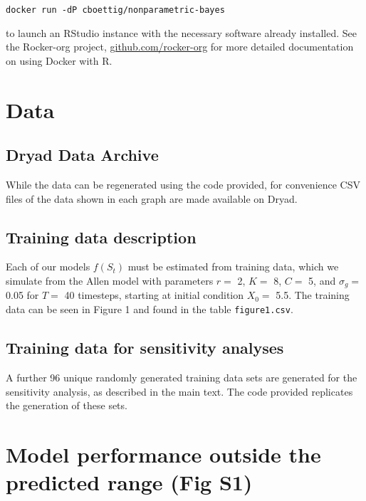 \documentclass[]{components/elsarticle}
\begin{document}
\begin{verbatim}
docker run -dP cboettig/nonparametric-bayes
\end{verbatim}

to launch an RStudio instance with the necessary software already
installed. See the Rocker-org project,
\href{https://github.com/rocker-org}{github.com/rocker-org} for more
detailed documentation on using Docker with R.

\section{Data}\label{data}

\subsection{Dryad Data Archive}\label{dryad-data-archive}

While the data can be regenerated using the code provided, for
convenience CSV files of the data shown in each graph are made available
on Dryad.

\subsection{Training data description}\label{training-data-description}

Each of our models $f(S_t)$ must be estimated from training data, which
we simulate from the Allen model with parameters $r = $ 2, $K =$ 8,
$C =$ 5, and $\sigma_g =$ 0.05 for $T=$ 40 timesteps, starting at
initial condition $X_0 = $ 5.5. The training data can be seen in Figure
1 and found in the table \texttt{figure1.csv}.

\subsection{Training data for sensitivity
analyses}\label{training-data-for-sensitivity-analyses}

A further 96 unique randomly generated training data sets are generated
for the sensitivity analysis, as described in the main text. The code
provided replicates the generation of these sets.

\section{Model performance outside the predicted range (Fig
S1)}\label{model-performance-outside-the-predicted-range-fig-s1}
\end{document}
